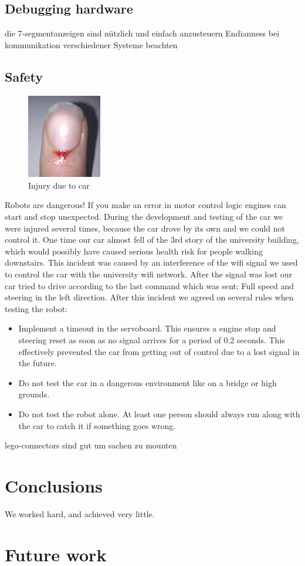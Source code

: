 \documentclass[a4paper
               ,10pt
               ,DIV=10 %
               ,BCOR=0.3cm
               ,pagesize %
               ,headings=small
               ,bibtotoc
               ]
               {scrartcl}
\begin{document}
\subsection{Debugging hardware}
die 7-segmentanzeigen sind nützlich und einfach anzusteuern
Endianness bei kommunikation verschiedener Systeme beachten
\subsection{Safety}
\begin{figure}
\includegraphics[width=0.29\textwidth]{pic/finger.png}
\caption{Injury due to car}
\label{figinjury}
\end{figure}
Robots are dangerous! If you make an error in motor control logic engines can start and stop unexpected. During the development and testing of the car we were injured several times, because the car drove by its own and we could not control it. One time our car almost fell of the 3rd story of the university building, which would possibly have caused serious health risk for people walking downstairs. This incident was caused by an interference of the wifi signal we used to control the car with the university wifi network. After the signal was lost our car tried to drive according to the last command which was sent: Full speed and steering in the left direction. After this incident we agreed on several rules when testing the robot:
\begin{itemize}
  \item Implement a timeout in the servoboard. This ensures a engine stop and steering reset as soon as no signal arrives for a period of 0.2 seconds. This effectively prevented the car from getting out of control due to a lost signal in the future.
  \item Do not test the car in a dangerous environment like on a bridge or high grounds.
  \item Do not test the robot alone. At least one person should always run along with the car to catch it if something goes wrong.
\end{itemize}




lego-connectors sind gut um sachen zu mounten




\section{Conclusions}\label{conclusions}
We worked hard, and achieved very little.

\section{Future work}
\end{document}

